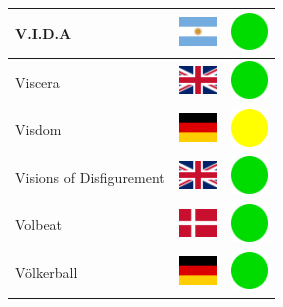 \documentclass[12pt, a4paper, twoside]{report}
\begin{document}
\begin{center}
\begin{longtable}{|p{5cm}|p{2cm}|p{2cm}|}
V.I.D.A & \includegraphics[width=1cm]{4x3/ar} & \includegraphics[width=1cm]{likes/y} \\ \hline
Viscera & \includegraphics[width=1cm]{4x3/gb} & \includegraphics[width=1cm]{likes/y} \\ \hline
Visdom & \includegraphics[width=1cm]{4x3/de} & \includegraphics[width=1cm]{likes/m} \\ \hline
Visions of Disfigurement & \includegraphics[width=1cm]{4x3/gb} & \includegraphics[width=1cm]{likes/y} \\ \hline
Volbeat & \includegraphics[width=1cm]{4x3/dk} & \includegraphics[width=1cm]{likes/y} \\ \hline
Völkerball & \includegraphics[width=1cm]{4x3/de} & \includegraphics[width=1cm]{likes/y} \\ \hline

\end{longtable}
\end{center}
\end{document}
